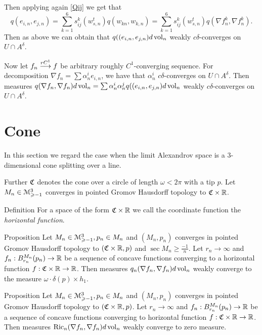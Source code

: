 \documentclass[a4paper,10pt]{article}
\begin{document}
Then applying again \ref{Qij} we get that 
$$q(e_{i,n},e_{j,n})=\sum_{k=1}^6 s_{ij}^k(w_{s,n}^t)q(w_{kn}, w_{k,n})=\sum_{k=1}^6  s_{ij}^k(w_{s,n}^t)q(\nabla f^k_n, \nabla f^k_n) .   $$
Then as above we can obtain that
$q((e_{i,n}, e_{j,n})d\operatorname{vol}_n$
  weakly $c\delta$-converges
on $U\cap A^\delta$.

Now let $f_n\stackrel{ rC^{1}}{\longrightarrow} f$ be arbitrary roughly $C^1$-converging sequence. For
decomposition $\nabla f_n =\sum \alpha^i_ne_{i,n}$,
we have that $ \alpha^i_n$
$c\delta$-converges
on $U\cap A^\delta$. Then measures
$q(\nabla f_n, \nabla f_n)d\operatorname{vol}_n=
\sum \alpha^i_n \alpha^j_n q((e_{i,n}, e_{j,n})d\operatorname{vol}_n$
weakly $c\delta$-converges
on $U\cap A^\delta$.

\qeds

\section{Cone}

In this section we regard the case when the limit Alexandrov space
is a 3-dimensional cone splitting over a line.

Further $\mathfrak{C}$ denotes the cone over a circle of length  $\omega<2\pi$
with a tip $p$.
Let $M_n\in\mathcal M_{\geqslant -1}^3$ converges in pointed
Gromov Hausdorff topology to $\mathfrak{C}\times\mathbb{R}$.

\begin{thm}{Definition}
For a space of the form  $\mathfrak{C}\times\mathbb{R}$
we call the
coordinate function   
the \emph{horizontal function}. 
\end{thm}

\begin{thm}{Proposition}
Let $M_n\in\mathcal M_{\geqslant -1}^3, p_n\in M_n$ and $(M_n,p_n)$ converges in pointed
Gromov Hausdorff topology to $(\mathfrak{C}\times\mathbb{R}, p)$
and $\operatorname{sec}M_n\ge\frac{-1}{n}$.
Let $r_n\to\infty$ and $f_n:B_{r_n}^{M_n}(p_n)\to \mathbb{R}$ be a sequence of concave
functions 
converging to a horizontal function $f:\mathfrak{C}\times\mathbb{R}\to\mathbb{R}$.
Then measures $q_n(\nabla f_n, \nabla f_n)d\operatorname{vol}_n$
weakly converge to the measure $\omega\cdot\delta(p)\times h_1$.

\end{thm}

\begin{thm}{Proposition}
Let $M_n\in\mathcal M_{\geqslant -1}^3, p_n\in M_n$ and $(M_n,p_n)$ converges in pointed
Gromov Hausdorff topology to $(\mathfrak{C}\times\mathbb{R}, p)$.
Let $r_n\to\infty$ and $f_n:B_{r_n}^{M_n}(p_n)\to \mathbb{R}$ be a sequence of concave
functions 
converging to horizontal function $f:\mathfrak{C}\times\mathbb{R}\to\mathbb{R}$.
Then measures $\operatorname{Ric}_n(\nabla f_n, \nabla f_n)d\operatorname{vol}_n$
weakly converge to zero measure.

\end{thm}
\end{document}
